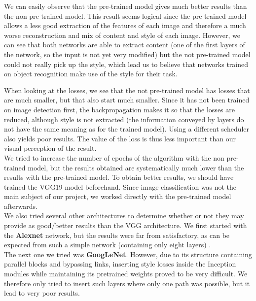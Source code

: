 \documentclass[twocolumn,superscriptaddress,aps,floatfix, nofootinbib]{revtex4-1}
\begin{document}
    We can easily observe that the pre-trained model gives much better results than the non pre-trained model. This result seems logical since the pre-trained model allows a less good extraction of the features of each image and therefore a much worse reconstruction and mix of content and style of each image. However, we can see that both networks are able to extract content (one of the first layers of the network, so the input is not yet very modified) but the not pre-trained model could not really pick up the style, which lead us to believe that networks trained on object recognition make use of the style for their task.
    
    When looking at the losses, we see that the not pre-trained model has losses that are much smaller, but that also start much smaller. Since it has not been trained on image detection first, the backpropagation makes it so that the losses are reduced, although style is not extracted (the information conveyed by layers do not have the same meaning as for the trained model). Using a different scheduler also yields poor results. The value of the loss is thus less important than our visual perception of the result.\\
    
    We tried to increase the number of epochs of the algorithm with the non pre-trained model, but the results obtained are systematically much lower than the results with the pre-trained model. To obtain better results, we should have trained the VGG19 model beforehand. Since image classification was not the main subject of our project, we worked directly with the pre-trained model afterwards.\\
    
    We also tried several other architectures to determine whether or not they may provide as good/better results than the VGG architecture. We first started with the \textbf{Alexnet} network, but the results were far from satisfactory, as can be expected from such a simple network (containing only eight layers) \cite{Krizhevsky2012ImageNetCW}.\\
    
    The next one we tried was \textbf{GoogLeNet}. However, due to its structure containing parallel blocks and bypassing links, inserting style losses inside the Inception modules while maintaining its pretrained weights proved to be very difficult. We therefore only tried to insert such layers where only one path was possible, but it lead to very poor results.\\
    
\end{document}

